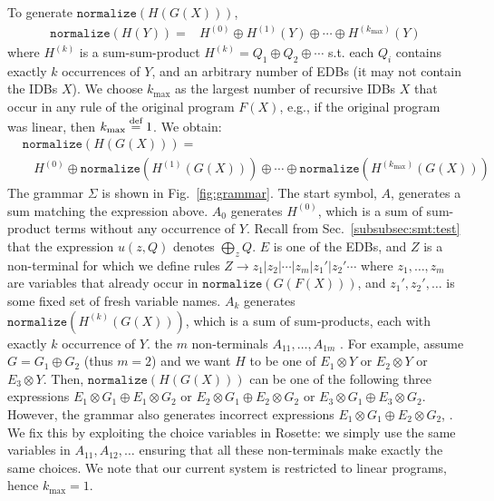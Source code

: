 To generate $\texttt{normalize}(H(G(X)))$, 
%
\begin{align*}
  \texttt{normalize}(H(Y)) = &  H^{(0)} \oplus H^{(1)}(Y) \oplus
  \cdots \oplus H^{(k_{\max})}(Y)
\end{align*}
%
where $H^{(k)}$ is a sum-sum-product
$H^{(k)} = Q_1 \oplus Q_2 \oplus \cdots$ s.t. each $Q_i$ contains
exactly $k$ occurrences of $Y$, and an arbitrary number of EDBs (it
may not contain the IDBs $X$).  We choose $k_{\max}$ as the largest
number of recursive IDBs $X$ that occur in any rule of the original
program $F(X)$, e.g.,  if the original program was linear, then
$k_{\max} \stackrel{\text{def}}{=} 1$.  We obtain:
%
{
\begin{align*}
  & \texttt{normalize}(H(G(X))) = \\
  & \ \ \ \   H^{(0)} \oplus \texttt{normalize}(H^{(1)}(G(X))) \oplus \cdots \oplus \texttt{normalize}(H^{(k_{\max})}(G(X)))
\end{align*}
}
%
%
The grammar $\Sigma$ is shown in Fig.~\ref{fig:grammar}.  The start
symbol, $A$, generates a sum matching the expression above.  $A_0$
generates $H^{(0)}$, which is a sum of sum-product terms without any
occurrence of $Y$.  Recall from Sec.~\ref{subsubsec:smt:test} that the
expression $u(z,Q)$ denotes $\bigoplus_z Q$.  $E$ is one of the EDBs,
and $Z$ is a non-terminal for which we define rules
$Z \rightarrow z_1 | z_2 | \cdots | z_m | z_1' | z_2' \cdots$ where
$z_1, \ldots, z_m$ are variables that already occur in
$\texttt{normalize}(G(F(X)))$, and $z_1', z_2', \ldots$ is some fixed
set of fresh variable names. $A_k$ generates
$\texttt{normalize}(H^{(k)}(G(X)))$, which is a sum of sum-products,
each with exactly $k$ occurrence of $Y$.  
the $m$ non-terminals $A_{11}, \ldots, A_{1m}$ .
For example, assume $G = G_1 \oplus G_2$ (thus $m=2$) and we want $H$
to be one of $E_1 \otimes Y$ or $E_2 \otimes Y$ or $E_3 \otimes Y$.
Then, $\texttt{normalize}(H(G(X)))$ can be one of the following three
expressions $E_1\otimes G_1 \oplus E_1 \otimes G_2$ or
$E_2 \otimes G_1 \oplus E_2 \otimes G_2$ or
$E_3 \otimes G_1 \oplus E_3 \otimes G_2$.  However, the grammar
 also generates
incorrect expressions $E_1 \otimes G_1 \oplus E_2 \otimes G_2$,
.  We fix this by exploiting the choice
variables in Rosette: we simply use the same variables in
$A_{11}, A_{12}, \ldots$ ensuring that all these non-terminals make
exactly the same choices.  We note that our current system is
restricted to linear programs, hence $k_{\max}=1$.

